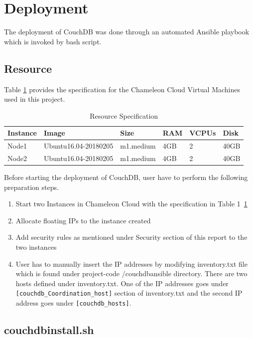 \section{Deployment}
The deployment of CouchDB  was done through an automated Ansible
playbook which is invoked by bash script.
\subsection{Resource}
Table \ref{t:resource-specification} provides the specification for
the Chameleon Cloud Virtual Machines used in this project.

\begin{table}[]
\centering
\caption{Resource Specification}
\label{t:resource-specification}
\begin{tabular}{|l|l|l|l|l|l|}
\hline
\textbf{Instance} & \textbf{Image}       & \textbf{Size} & \textbf{RAM} & \textbf{VCPUs} & \textbf{Disk} \\ \hline
Node1             & Ubuntu16.04-20180205 & m1.medium     & 4GB          & 2              & 40GB          \\ \hline
Node2             & Ubuntu16.04-20180205 & m1.medium     & 4GB          & 2              & 40GB          \\ \hline
\end{tabular}
\end{table}

Before starting the deployment of CouchDB, user have to perform the
following preparation steps.
\begin{enumerate}
  \item Start two Instances in Chameleon Cloud with the specification
    in Table 1~\ref{t:resource-specification}
   \item  Allocate floating IPs to the instance created
    \item Add  security rules as mentioned under Security section
      of this report to the two instances 
    \item  User has to manually insert the IP addresses by modifying
      inventory.txt file which is found under project-code
      /couchdbansible directory. There are two hosts 
      defined under inventory.txt. One of the IP addresses
      goes under \verb|[couchdb_Coordination_host]| section of inventory.txt
      and the second IP address goes under \verb|[couchdb_hosts]|.
\end{enumerate}

\subsection{couchdbinstall.sh}

